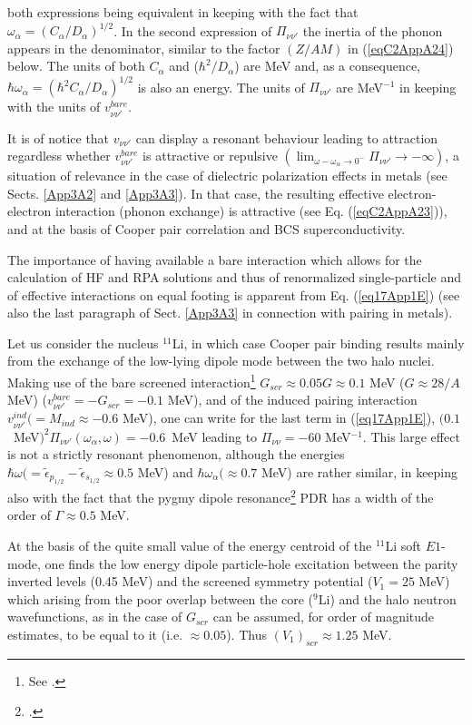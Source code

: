both expressions being equivalent in keeping with the fact that $\omega_\alpha=(C_\alpha/D_\alpha)^{1/2}$. In the second expression of $\Pi_{\nu\nu'}$  the inertia of the phonon appears in the denominator, similar to the factor $(Z/AM)$  in (\ref{eqC2AppA24}) below. The units of both $C_\alpha$ and ($\hbar^2/D_\alpha$) are  MeV and, as a consequence, $\hbar\omega_\alpha=(\hbar^2C_\alpha/D_\alpha)^{1/2}$ is also an energy. The units of $\Pi_{\nu\nu'}$ are MeV$^{-1}$ in keeping with the units of  $v^{bare}_{\nu\nu'}$. 

It is of notice that $v_{\nu\nu'}$ can display a resonant behaviour leading to attraction regardless whether $v_{\nu\nu'}^{bare}$ is attractive or repulsive $(\lim_{\omega-\omega_\alpha\to0^-}\Pi_{\nu\nu'}\to-\infty)$, a situation of relevance in the case of dielectric polarization effects in metals (see Sects. \ref{App3A2} and \ref{App3A3}). In that case, the resulting effective electron-electron interaction (phonon exchange) is attractive (see Eq. (\ref{eqC2AppA23})), and  at the basis of Cooper pair correlation and BCS superconductivity.

The importance of having available a bare interaction which allows for the calculation of HF and RPA solutions and thus of renormalized single-particle and of effective interactions on equal footing is apparent from Eq. (\ref{eq17App1E}) (see also the last paragraph of Sect. \ref{App3A3} in connection with pairing in metals).

Let us consider the nucleus $^{11}$Li, in which case Cooper pair binding results mainly from the exchange of the low-lying dipole mode between the two halo nuclei. Making use of the bare screened interaction\footnote{See \cite{Broglia:19b}.} $G_{scr}\approx0.05G\approx0.1$ MeV ($G\approx 28/A$ MeV) ($v_{\nu\nu'}^{bare}=-G_{scr}=-0.1$ MeV), and of the induced pairing interaction $v^{ind}_{\nu\nu'}(=M_{ind}\approx-0.6$ MeV), one can write for the last term in (\ref{eq17App1E}), \mbox{$(0.1$ MeV$)^2\Pi_{\nu\nu'}(\omega_\alpha,\omega)=-0.6$ MeV} leading to $\Pi_{\nu\nu}=-60$ MeV$^{-1}$. This large effect is not a strictly resonant phenomenon, although the energies $\hbar\omega(=\tilde\epsilon_{p_{1/2}}-\tilde\epsilon_{s_{1/2}}\approx0.5$ MeV) and $\hbar\omega_\alpha(\approx0.7$ MeV) are rather similar, in keeping also with the fact that the pygmy dipole resonance\footnote{\cite{Broglia:19}.} PDR has a width of the order of $\Gamma\approx0.5$ MeV.

At the basis of the quite small value of the energy centroid of the $^{11}$Li soft $E1$-mode, one finds the low energy dipole particle-hole excitation between the parity inverted levels (0.45 MeV) and the screened symmetry potential ($V_1=25$ MeV) which arising from the poor overlap between the core ($^9$Li) and the halo neutron wavefunctions, as in the case of $G_{scr}$ can be assumed, for order of magnitude estimates, to be equal to it (i.e. $\approx0.05$). Thus $(V_1)_{scr}\approx1.25$ MeV.



